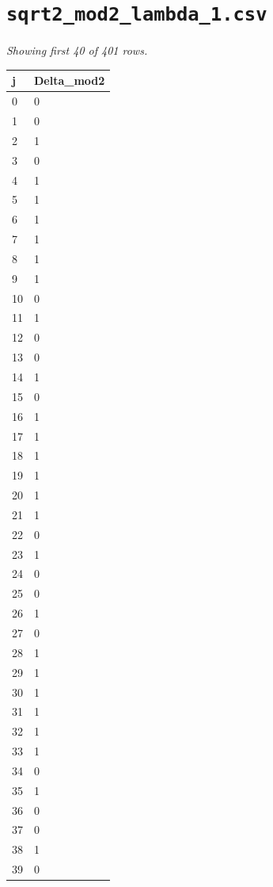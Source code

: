 \documentclass[10pt]{article}
\begin{document}
\section*{\texttt{sqrt2\_mod2\_lambda\_1.csv}}
\noindent\textit{Showing first 40 of 401 rows.}\par\medskip
{\footnotesize
\begin{longtable}{@{}ll@{}}
\toprule
\textbf{j} & \textbf{Delta\_mod2} \\
\midrule\endhead
0 & 0 \\
1 & 0 \\
2 & 1 \\
3 & 0 \\
4 & 1 \\
5 & 1 \\
6 & 1 \\
7 & 1 \\
8 & 1 \\
9 & 1 \\
10 & 0 \\
11 & 1 \\
12 & 0 \\
13 & 0 \\
14 & 1 \\
15 & 0 \\
16 & 1 \\
17 & 1 \\
18 & 1 \\
19 & 1 \\
20 & 1 \\
21 & 1 \\
22 & 0 \\
23 & 1 \\
24 & 0 \\
25 & 0 \\
26 & 1 \\
27 & 0 \\
28 & 1 \\
29 & 1 \\
30 & 1 \\
31 & 1 \\
32 & 1 \\
33 & 1 \\
34 & 0 \\
35 & 1 \\
36 & 0 \\
37 & 0 \\
38 & 1 \\
39 & 0 \\
\bottomrule
\end{longtable}}
\end{document}
